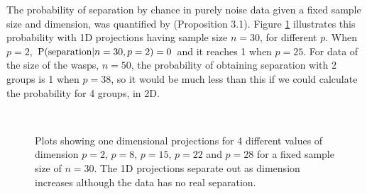 The probability of separation by chance in purely noise data given a fixed sample size and dimension,  was quantified by \cite{ripley:1996} (Proposition 3.1). Figure \ref{dist_1d} illustrates this probability with 1D projections having sample size $n = 30$, for different $p$. When $p = 2$, $\hbox{P(separation}|n = 30, p = 2) = 0$ and it reaches 1 when $p = 25$. For data of the size of the wasps, $n = 50$, the probability of obtaining separation with 2 groups is 1 when $p = 38$, so it would be much less than this if we could calculate the probability for 4 groups, in 2D.

\begin{figure}[htbp]
\centering
\mbox{\quad
{}\quad
{}\quad
{}\quad
{}}
\caption{Plots showing one dimensional projections for 4 different values of dimension $p=2$, $p=8$, $p = 15$, $p=22$ and $p=28$ for a fixed sample size of $n = 30$. The 1D projections separate out as dimension increases although the data has no real separation.  } 
\label{dist_1d}
\end{figure}


